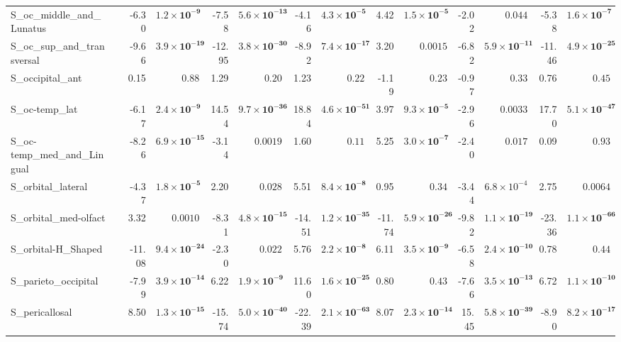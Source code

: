 {\begin{longtable}{llrrrrrrrrrrrr}
S\_oc\_middle\_and\_Lunatus &  & -6.30 & $\mathbf{1.2{\times}10^{-9}}$ & -7.58 & $\mathbf{5.6{\times}10^{-13}}$ & -4.16 & $\mathbf{4.3{\times}10^{-5}}$ & 4.42 & $\mathbf{1.5{\times}10^{-5}}$ & -2.02 & $0.044$ & -5.38 & $\mathbf{1.6{\times}10^{-7}}$ \\
S\_oc\_sup\_and\_transversal &  & -9.66 & $\mathbf{3.9{\times}10^{-19}}$ & -12.95 & $\mathbf{3.8{\times}10^{-30}}$ & -8.92 & $\mathbf{7.4{\times}10^{-17}}$ & 3.20 & $0.0015$ & -6.82 & $\mathbf{5.9{\times}10^{-11}}$ & -11.46 & $\mathbf{4.9{\times}10^{-25}}$ \\
S\_occipital\_ant &  & 0.15 & $0.88$ & 1.29 & $0.20$ & 1.23 & $0.22$ & -1.19 & $0.23$ & -0.97 & $0.33$ & 0.76 & $0.45$ \\
S\_oc-temp\_lat &  & -6.17 & $\mathbf{2.4{\times}10^{-9}}$ & 14.54 & $\mathbf{9.7{\times}10^{-36}}$ & 18.84 & $\mathbf{4.6{\times}10^{-51}}$ & 3.97 & $\mathbf{9.3{\times}10^{-5}}$ & -2.96 & $0.0033$ & 17.70 & $\mathbf{5.1{\times}10^{-47}}$ \\
S\_oc-temp\_med\_and\_Lingual &  & -8.26 & $\mathbf{6.9{\times}10^{-15}}$ & -3.14 & $0.0019$ & 1.60 & $0.11$ & 5.25 & $\mathbf{3.0{\times}10^{-7}}$ & -2.40 & $0.017$ & 0.09 & $0.93$ \\
S\_orbital\_lateral &  & -4.37 & $\mathbf{1.8{\times}10^{-5}}$ & 2.20 & $0.028$ & 5.51 & $\mathbf{8.4{\times}10^{-8}}$ & 0.95 & $0.34$ & -3.44 & $6.8{\times}10^{-4}$ & 2.75 & $0.0064$ \\
S\_orbital\_med-olfact &  & 3.32 & $0.0010$ & -8.31 & $\mathbf{4.8{\times}10^{-15}}$ & -14.51 & $\mathbf{1.2{\times}10^{-35}}$ & -11.74 & $\mathbf{5.9{\times}10^{-26}}$ & -9.82 & $\mathbf{1.1{\times}10^{-19}}$ & -23.36 & $\mathbf{1.1{\times}10^{-66}}$ \\
S\_orbital-H\_Shaped &  & -11.08 & $\mathbf{9.4{\times}10^{-24}}$ & -2.30 & $0.022$ & 5.76 & $\mathbf{2.2{\times}10^{-8}}$ & 6.11 & $\mathbf{3.5{\times}10^{-9}}$ & -6.58 & $\mathbf{2.4{\times}10^{-10}}$ & 0.78 & $0.44$ \\
S\_parieto\_occipital &  & -7.99 & $\mathbf{3.9{\times}10^{-14}}$ & 6.22 & $\mathbf{1.9{\times}10^{-9}}$ & 11.60 & $\mathbf{1.6{\times}10^{-25}}$ & 0.80 & $0.43$ & -7.66 & $\mathbf{3.5{\times}10^{-13}}$ & 6.72 & $\mathbf{1.1{\times}10^{-10}}$ \\
S\_pericallosal &  & 8.50 & $\mathbf{1.3{\times}10^{-15}}$ & -15.74 & $\mathbf{5.0{\times}10^{-40}}$ & -22.39 & $\mathbf{2.1{\times}10^{-63}}$ & 8.07 & $\mathbf{2.3{\times}10^{-14}}$ & 15.45 & $\mathbf{5.8{\times}10^{-39}}$ & -8.90 & $\mathbf{8.2{\times}10^{-17}}$ \\

\end{longtable}}
